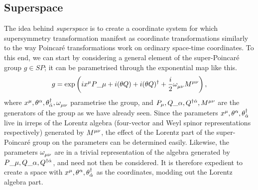 \documentclass[../main.tex]{subfiles}
\begin{document}
\subsection{Superspace}
The idea behind \emph{superspace} is to create a coordinate system for which supersymmetry transformation manifest as coordinate transformations similarly to the way Poincaré transformations work on ordinary space-time coordinates.
To this end, we can start by considering a general element of the super-Poincaré group \(g \in SP\); it can be parametrised through the exponential map like this.
\begin{equation}
  g = \exptext{ix\^{\mu} P\_{\mu} + i(\theta Q) + i (\theta Q)^\dagger + \frac{i}{2}\tensor{\omega}{_\mu_\nu}\tensor{M}{^\mu^\nu}},
\end{equation}
where \(x^\mu, \theta\^{\alpha}, \theta\indices*{^\dagger_{\dot\alpha}}, \tensor{\omega}{_\mu_\nu}\) parametrise the group, and \(P_\mu, Q\_{\alpha}, Q\indices*{^\dagger^{\dot\alpha}}, \tensor{M}{^\mu^\nu}\) are the generators of the group as we have already seen.
Since the parameters \(x\^{\mu}, \theta\^{\alpha}, \theta\indices*{^\dagger_{\dot\alpha}}\) live in irreps of the Lorentz algebra (four-vector and Weyl spinor representations respectively) generated by \(\tensor{M}{^\mu^\nu}\), the effect of the Lorentz part of the super-Poincaré group on the parameters can be determined easily.
Likewise, the parameters \(\tensor{\omega}{_\mu_\nu}\) are in a trivial representation of the algebra generated by \(P\_{\mu}, Q\_{\alpha}, Q\indices*{^\dagger^{\dot\alpha}}\), and need not then be considered.
It is therefore expedient to create a space with \(x\^{\mu}, \theta\^{\alpha}, \theta\indices*{^\dagger_{\dot\alpha}}\) as the coordinates, modding out the Lorentz algebra part.
\end{document}
